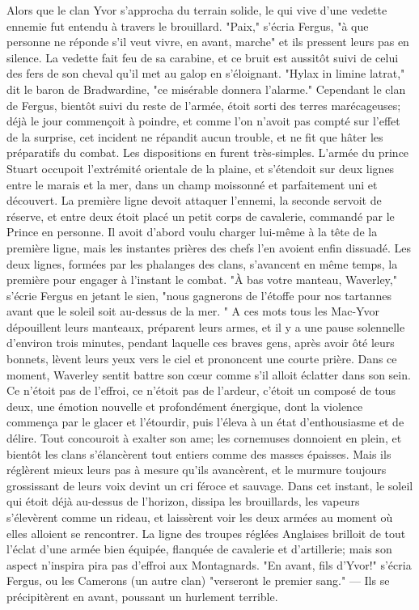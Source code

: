 Alors que le clan Yvor s'approcha du terrain solide, le qui vive d'une vedette ennemie fut entendu à travers le brouillard. "Paix," s'écria Fergus, "à que personne ne réponde s'il veut vivre, en avant, marche" et ils pressent leurs pas en silence.
La vedette fait feu de sa carabine, et ce bruit est aussitôt suivi de celui des fers de son cheval qu'il met au galop en s'éloignant.\setcounter{page}{243} "Hylax in limine latrat," dit le baron de Bradwardine, "ce misérable donnera l'alarme."
Cependant le clan de Fergus, bientôt suivi du reste de l'armée, étoit sorti des terres marécageuses; déjà le jour commençoit à poindre, et comme l'on n'avoit pas compté sur l'effet de la surprise, cet incident ne répandit aucun trouble, et ne fit que hâter les préparatifs du combat.
Les dispositions en furent très-simples. L'armée du prince Stuart occupoit l'extrémité orientale de la plaine, et s'étendoit sur deux lignes entre le marais et la mer, dans un champ moissonné et parfaitement uni et découvert. La première ligne devoit attaquer l'ennemi, la seconde servoit de réserve, et entre deux étoit placé un petit corps de cavalerie, commandé par le Prince en personne. Il avoit d'abord voulu charger lui-même à la tête de la première ligne, mais les instantes prières des chefs l'en avoient enfin dissuadé.
Les deux lignes, formées par les phalanges des clans, s'avancent en même temps, la première pour engager à l'instant le combat. "À bas votre manteau, Waverley," s'écrie Fergus en jetant le sien, "nous gagnerons de l'étoffe pour nos tartannes avant que le soleil\setcounter{page}{244} soit au-dessus de la mer. " A ces mots tous les Mac-Yvor dépouillent leurs manteaux, préparent leurs armes, et il y a une pause solennelle d'environ trois minutes, pendant laquelle ces braves gens, après avoir ôté leurs bonnets, lèvent leurs yeux vers le ciel et prononcent une courte prière. Dans ce moment, Waverley sentit battre son cœur comme s'il alloit éclatter dans son sein. Ce n'étoit pas de l'effroi, ce n'étoit pas de l'ardeur, c'étoit un composé de tous deux, une émotion nouvelle et profondément énergique, dont la violence commença par le glacer et l'étourdir, puis l'éleva à un état d'enthousiasme et de délire. Tout concouroit à exalter son ame; les cornemuses donnoient en plein, et bientôt les clans s'élancèrent tout entiers comme des masses épaisses. Mais ils réglèrent mieux leurs pas à mesure qu'ils avancèrent, et le murmure toujours grossissant de leurs voix devint un cri féroce et sauvage.
Dans cet instant, le soleil qui étoit déjà au-dessus de l'horizon, dissipa les brouillards, les vapeurs s'élevèrent comme un rideau, et laissèrent voir les deux armées au moment où elles alloient se rencontrer. La ligne des troupes réglées Anglaises brilloit de tout l'éclat d'une armée bien équipée, flanquée de cavalerie et d'artillerie; mais son aspect n'inspira\setcounter{page}{245} pira pas d'effroi aux Montagnards. "En avant, fils d'Yvor!" s'écria Fergus, ou les Camerons (un autre clan) "verseront le premier sang." — Ils se précipitèrent en avant, poussant un hurlement terrible.
